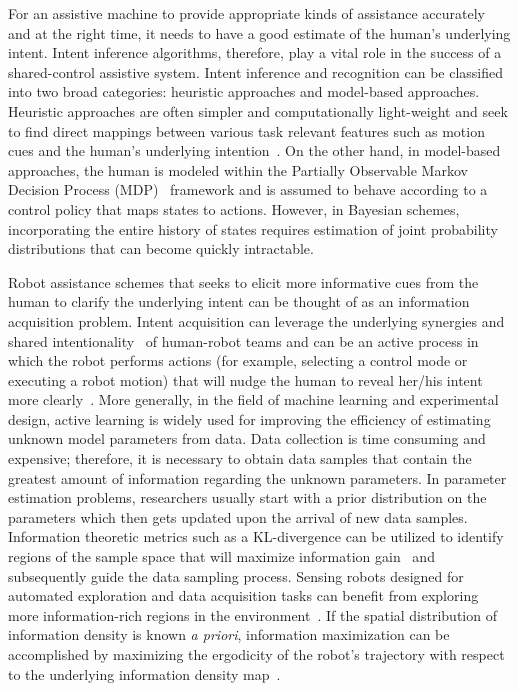 \documentclass[conference]{IEEEtran}
\begin{document}
For an assistive machine to provide appropriate kinds of assistance accurately and at the right time, it needs to have a good estimate of the human's underlying intent. Intent inference algorithms, therefore, play a vital role in the success of a shared-control assistive system. Intent inference and recognition can be classified into two broad categories: heuristic approaches and model-based approaches. Heuristic approaches are often simpler and computationally light-weight and seek to find direct mappings between various task relevant features such as motion cues and the human's underlying intention~\citep{baker2007goal, baker2009action}. On the other hand, in model-based approaches, the human is modeled within the Partially Observable Markov Decision Process (MDP)~\citep{taha2011pomdp, dragan2013policy} framework and is assumed to behave according to a control policy that maps states to actions. However, in Bayesian schemes, incorporating the entire history of states requires estimation of joint probability distributions that can become quickly intractable. 

Robot assistance schemes that seeks to elicit more informative cues from the human to clarify the underlying intent can be thought of as an information acquisition problem. Intent acquisition can leverage the underlying synergies and shared intentionality~\citep{tomasello2007shared} of human-robot teams and can be an active process in which the robot performs actions (for example, selecting a control mode or executing a robot motion) that will nudge the human to reveal her/his intent more clearly~\cite{sadigh2016information, sadigh2016planning}. More generally, in the field of machine learning and experimental design, active learning is widely used for improving the efficiency of estimating unknown model parameters from data. Data collection is time consuming and expensive; therefore, it is necessary to obtain data samples that contain the greatest amount of information regarding the unknown parameters. In parameter estimation problems, researchers usually start with a prior distribution on the parameters which then gets updated upon the arrival of new data samples. Information theoretic metrics such as a KL-divergence can be utilized to identify regions of the sample space that will maximize information gain~\citep{tong2001active} and subsequently guide the data sampling process. 
Sensing robots designed for automated exploration and data acquisition tasks can benefit from exploring more information-rich regions in the environment~\citep{atanasov2014information}. If the spatial distribution of information density is known \textit{a priori}, information maximization can be accomplished by maximizing the ergodicity of the robot's trajectory with respect to the underlying information density map~\citep{miller2016ergodic, miller2013trajectory}. 
\end{document}
